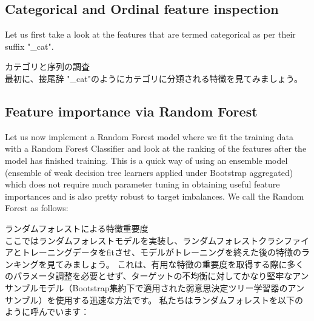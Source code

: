 \documentclass[11pt]{article}
\begin{document}
    \subsection{Categorical and Ordinal feature
inspection}\label{categorical-and-ordinal-feature-inspection}

Let us first take a look at the features that are termed categorical as
per their suffix "\_cat".

    カテゴリと序列の調査\\
最初に、接尾辞 "\_cat"のようにカテゴリに分類される特徴を見てみましょう。

    \subsection{Feature importance via Random
Forest}\label{feature-importance-via-random-forest}

Let us now implement a Random Forest model where we fit the training
data with a Random Forest Classifier and look at the ranking of the
features after the model has finished training. This is a quick way of
using an ensemble model (ensemble of weak decision tree learners applied
under Bootstrap aggregated) which does not require much parameter tuning
in obtaining useful feature importances and is also pretty robust to
target imbalances. We call the Random Forest as follows:

    ランダムフォレストによる特徴重要度\\
ここではランダムフォレストモデルを実装し、ランダムフォレストクラシファイアとトレーニングデータをfitさせ、モデルがトレーニングを終えた後の特徴のランキングを見てみましょう。
これは、有用な特徴の重要度を取得する際に多くのパラメータ調整を必要とせず、ターゲットの不均衡に対してかなり堅牢なアンサンブルモデル（Bootstrap集約下で適用された弱意思決定ツリー学習器のアンサンブル）を使用する迅速な方法です。
私たちはランダムフォレストを以下のように呼んでいます：
\end{document}
